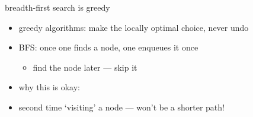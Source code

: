 \begin{frame}{breadth-first search is greedy}
\begin{itemize}
\item greedy algorithms: make the locally optimal choice, never undo
\item BFS: once one finds a node, one enqueues it once
\begin{itemize}
\item find the node later --- skip it
\end{itemize}
\vspace{.5cm}
\item why this is okay: 
\item second time `visiting' a node --- won't be a shorter path!
\end{itemize}
\end{frame}

